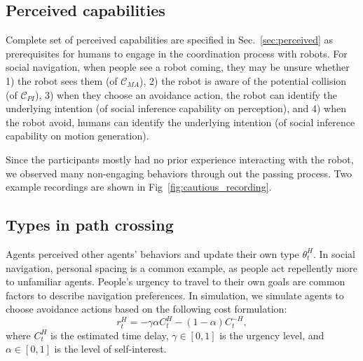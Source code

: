 \documentclass[letterpaper, 10 pt, conference]{ieeeconf}  %
\begin{document}
\subsection{Perceived capabilities}
Complete set of perceived capabilities are specified in Sec.~\ref{sec:perceived} as 
prerequisites for humans to engage in the coordination process with robots. 
For social navigation, when people see a robot coming, they may be unsure 
whether 1) the robot sees them (of $\mathcal{C}_{MA}$), 2) the robot is aware of the potential 
collision (of $\mathcal{C}_{PI}$), 3) when they choose an avoidance action, the robot can identify the underlying 
intention (of social inference capability on perception), and 4) when the robot 
avoid, humans can identify the underlying intention (of social inference 
capability on motion generation). 

Since the participants mostly had no prior experience interacting with the 
robot, we observed many non-engaging behaviors through out the passing 
process. Two example recordings are shown in Fig~\ref{fig:cautious_recording}. 

\subsection{Types in path crossing}
Agents perceived other agents' behaviors and update their own type $\theta^H_t$. In 
social navigation, personal spacing is a common example, as people act 
repellently more to unfamiliar agents. People's urgency to travel to their own 
goals are common factors to describe navigation preferences. In simulation, we 
simulate agents to choose avoidance actions based on the following cost formulation:
\begin{equation}
  r^H_t = -\gamma \alpha C^H_t  -(1-\alpha) C^{-H}_t,
\end{equation}
where $C^H_t$ is the estimated time delay, $\gamma \in [0,1]$ is the urgency 
level, and $\alpha \in [0,1]$ is the level of self-interest.
\end{document}
